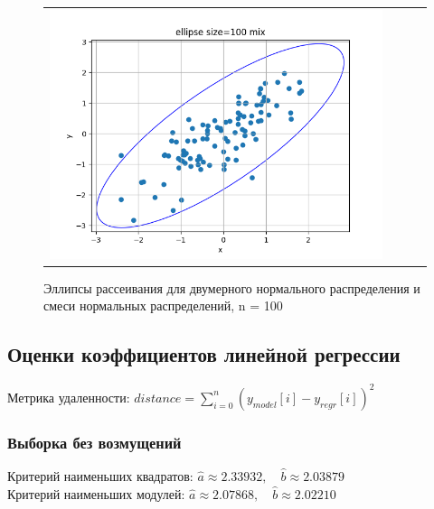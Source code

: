 \begin{figure}[H]
\begin{tabular}{cccc}
		\includegraphics[scale=0.3]{ellipse_100_mix.png}
	\end{tabular}
	\caption{Эллипсы рассеивания для двумерного нормального распределения и смеси нормальных распределений, n = 100}
\end{figure}

\subsection{Оценки коэффициентов линейной регрессии}

Метрика удаленности: $distance = \sum\limits_{i=0}^{n} (y_{model}[i] - y_{regr}[i])^{2} $

\subsubsection{Выборка без возмущений}

Критерий наименьших квадратов: $\hat{a} \approx 2.33932, \quad \hat{b} \approx 2.03879$ \\

Критерий наименьших модулей: $\hat{a} \approx 2.07868, \quad \hat{b} \approx 2.02210$

